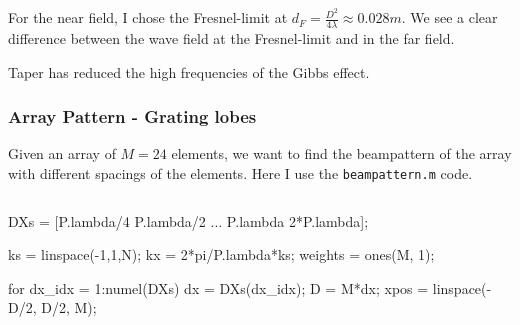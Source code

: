 \documentclass[compress]{beamer}
\newcommand\pin{%
\parbox[t]{10pt}{\raisebox{0.2pt}{\usebeamercolor[fg]{mybullet}{$\ast$}}}}
\begin{document}
\begin{frame}[fragile]
\begin{columns}
\begin{column}{0.5\textwidth}
\begin{figure}
            \end{figure}
        \end{column}
    \end{columns}
    \vspace{1mm}
    For the near field, I chose the Fresnel-limit
    at $d_F = \frac{D^2}{4λ} \approx 0.028m$. We see a clear difference between the
    wave field at the Fresnel-limit and in the far field. \\
    \pin Taper has reduced the high frequencies of the Gibbs effect.
    
\end{frame}

\begin{frame}[fragile] %
    \frametitle{Array Pattern - Grating lobes}
    Given an array of $M=24$ elements, we want to find the beampattern of the array
    with different spacings of the elements. Here I use the \texttt{beampattern.m} code.
    \begin{columns}
        \begin{column}{0.52\textwidth}
            \begin{jllisting}[gobble=16, language=Matlab]
                DXs = [P.lambda/4   P.lambda/2 ...
                       P.lambda   2*P.lambda];

                ks = linspace(-1,1,N);
                kx = 2*pi/P.lambda*ks;
                weights = ones(M, 1);

                for dx_idx = 1:numel(DXs)
                    dx = DXs(dx_idx);
                    D = M*dx;
                    xpos = linspace(-D/2, D/2, M);
                    

\end{jllisting}
\end{column}
\end{columns}
\end{frame}
\end{document}

